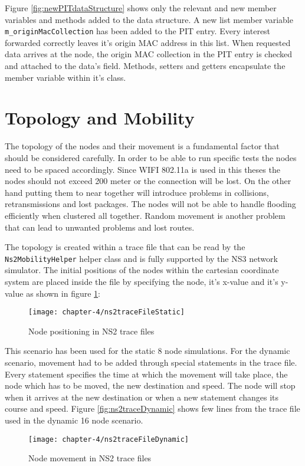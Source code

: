 Figure \ref{fig:newPITdataStructure} shows only the relevant and new member variables and methods added to the data structure. A new list member variable \texttt{m\_originMacCollection} has been added to the PIT entry. Every interest forwarded correctly leaves it's origin MAC address in this list. When requested data arrives at the node, the origin MAC collection in the PIT entry is checked and attached to the data's field. Methods, setters and getters encapsulate the member variable within it's class.

\section{Topology and Mobility}

The topology of the nodes and their movement is a fundamental factor that should be considered carefully. In order to be able to run specific tests the nodes need to be spaced accordingly. Since WIFI 802.11a is used in this theses the nodes should not exceed 200 meter or the connection will be lost. On the other hand putting them to near together will introduce problems in collisions, retransmissions and lost packages. The nodes will not be able to handle flooding efficiently when clustered all together. Random movement is another problem that can lead to unwanted problems and lost routes.
 
The topology is created within a trace file that can be read by the \texttt{Ns2MobilityHelper} helper class and is fully supported by the NS3 network simulator. The initial positions of the nodes within the cartesian coordinate system are placed inside the file by specifying the node, it's x-value and it's y-value as shown in figure \ref{fig:ns2traceFileStatic}:

\begin{figure}[H]
  \centering
  \texttt{[image: chapter-4/ns2traceFileStatic]}
  \caption{Node positioning in NS2 trace files}
  \label{fig:ns2traceFileStatic}
\end{figure}

This scenario has been used for the static 8 node simulations. For the dynamic scenario, movement had to be added through special statements in the trace file. Every statement specifies the time at which the movement will take place, the node which has to be moved, the new destination and speed. The node will stop when it arrives at the new destination or when a new statement changes its course and speed. Figure \ref{fig:ns2traceDynamic} shows few lines from the trace file used in the dynamic 16 node scenario.

\begin{figure}[H]
  \centering
  \texttt{[image: chapter-4/ns2traceFileDynamic]}
  \caption{Node movement in NS2 trace files}
  \label{fig:ns2traceFileDynamic}
\end{figure}




